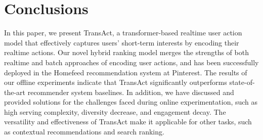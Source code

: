 \section{Conclusions}
\label{sec:conclusion}
In this paper, we present TransAct,  a transformer-based realtime user action model that effectively captures users' short-term interests by encoding their realtime actions.
Our novel hybrid ranking model merges the strengths of both realtime and batch approaches of encoding user actions, and has been successfully deployed in the Homefeed recommendation system at Pinterest. 
The results of our offline experiments indicate that TransAct significantly outperforms state-of-the-art recommender system baselines.  
 In addition, we have discussed and provided solutions for the challenges faced during online experimentation, such as high serving complexity, diversity decrease, and engagement decay. 
 The versatility and effectiveness of TransAct make it applicable for other tasks, such as contextual recommendations and search ranking.
